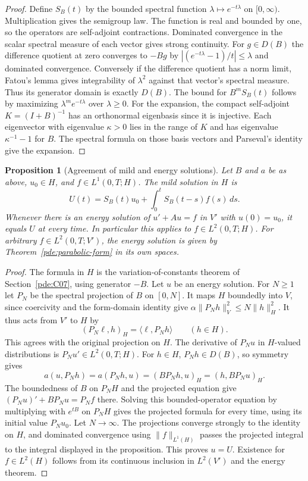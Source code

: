 \documentclass[11pt,oneside,openany]{book}
\theoremstyle{plain}
\newtheorem{proposition}[theorem]{Proposition}
\theoremstyle{definition}
\theoremstyle{remark}
\begin{document}
\begin{proof}
Define \(S_B(t)\) by the bounded spectral function
\(\lambda\mapsto e^{-t\lambda}\) on \([0,\infty)\).
Multiplication gives the semigroup law. The function is real
and bounded by one, so the operators are self-adjoint
contractions. Dominated convergence in the scalar spectral
measure of each vector gives strong continuity.
For \(g\in D(B)\) the difference quotient at zero converges
to \(-Bg\) by
\(|(e^{-t\lambda}-1)/t|\leq\lambda\) and dominated convergence.
Conversely if the difference quotient has a norm limit,
Fatou's lemma gives integrability of \(\lambda^2\)
against that vector's spectral measure. Thus its generator
domain is exactly \(D(B)\). The bound for \(B^m S_B(t)\)
follows by maximizing \(\lambda^m e^{-t\lambda}\) over
\(\lambda\geq0\).
For the expansion, the compact self-adjoint \(K=(I+B)^{-1}\)
has an orthonormal eigenbasis since it is injective.
Each eigenvector with eigenvalue \(\kappa>0\) lies in the
range of \(K\) and has eigenvalue \(\kappa^{-1}-1\) for \(B\).
The spectral formula on those basis vectors and Parseval's
identity give the expansion.
\end{proof}

\begin{proposition}[Agreement of mild and energy solutions]
\label{pde:heat-mild-energy}
Let \(B\) and \(a\) be as above, \(u_0\in H\), and
\(f\in L^1(0,T;H)\). The mild solution in \(H\) is
\[
 U(t)=S_B(t)u_0+\int_0^t S_B(t-s)f(s)\,ds .
\]
Whenever there is an energy solution of
\(u'+Au=f\) in \(V'\) with \(u(0)=u_0\), it equals \(U\) at
every time. In particular this applies to \(f\in L^2(0,T;H)\).
For arbitrary \(f\in L^2(0,T;V')\), the energy solution is
given by Theorem~\ref{pde:parabolic-form} in its own spaces.
\end{proposition}

\begin{proof}
The formula in \(H\) is the variation-of-constants theorem of
Section~\ref{pde:C07}, using generator \(-B\).
Let \(u\) be an energy solution. For \(N\geq1\) let
\(P_N\) be the spectral projection of \(B\) on \([0,N]\).
It maps \(H\) boundedly into \(V\), since coercivity and the
form-domain identity give
\(\alpha\|P_N h\|_V^2\leq N\|h\|_H^2\).
It thus acts from \(V'\) to \(H\) by
\[
 (P_N\ell,h)_H=\langle \ell,P_Nh\rangle \qquad(h\in H).
\]
This agrees with the original projection on \(H\).
The derivative of \(P_Nu\) in \(H\)-valued distributions is
\(P_Nu'\in L^2(0,T;H)\).
For \(h\in H\), \(P_Nh\in D(B)\), so symmetry gives
\[
 a(u,P_Nh)=a(P_Nh,u)=(BP_Nh,u)_H=(h,BP_Nu)_H .
\]
The boundedness of \(B\) on \(P_NH\) and the projected equation
give \((P_Nu)'+BP_Nu=P_N f\) there.
Solving this bounded-operator equation by multiplying with
\(e^{tB}\) on \(P_NH\) gives the projected formula for every
time, using its initial value \(P_Nu_0\).
Let \(N\to\infty\). The projections converge strongly to the
identity on \(H\), and dominated convergence using
\(\|f\|_{L^1(H)}\) passes the projected integral to the
integral displayed in the proposition. This proves \(u=U\).
Existence for \(f\in L^2(H)\) follows from its continuous
inclusion in \(L^2(V')\) and the energy theorem.
\end{proof}
\end{document}
